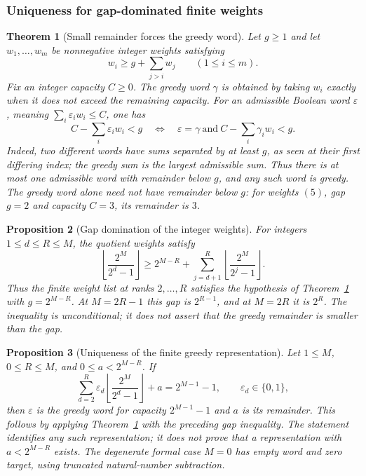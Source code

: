 \documentclass[11pt]{article}
\theoremstyle{plain}
\newtheorem{thm}{Theorem}[section]
\newtheorem{prop}[thm]{Proposition}
\theoremstyle{definition}
\theoremstyle{remark}
\begin{document}
\subsubsection*{Uniqueness for gap-dominated finite weights}

\begin{thm}[Small remainder forces the greedy word]\label{record:257bm-i11a}
Let $g\ge1$ and let $w_1,\ldots,w_m$ be nonnegative integer weights
satisfying
\[
 w_i\ge g+\sum_{j>i}w_j\qquad(1\le i\le m).
\]
Fix an integer capacity $C\ge0$. The greedy word $\gamma$ is obtained
by taking $w_i$ exactly when it does not exceed the remaining capacity.
For an admissible Boolean word $\varepsilon$, meaning
$\sum_i\varepsilon_iw_i\le C$, one has
\[
 C-\sum_i\varepsilon_iw_i<g
 \quad\Longleftrightarrow\quad
 \varepsilon=\gamma\ \text{and}\
 C-\sum_i\gamma_iw_i<g.
\]
Indeed, two different words have sums separated by at least $g$, as
seen at their first differing index; the greedy sum is the largest
admissible sum. Thus there is at most one admissible word with remainder
below $g$, and any such word is greedy. The greedy word alone need not
have remainder below $g$: for weights $(5)$, gap $g=2$ and capacity
$C=3$, its remainder is $3$.
\end{thm}

\begin{prop}[Gap domination of the integer weights]\label{record:257bm-i11b}
For integers $1\le d\le R\le M$, the quotient weights satisfy
\[
 \left\lfloor\frac{2^M}{2^d-1}\right\rfloor
 \ge 2^{M-R}+
 \sum_{j=d+1}^{R}\left\lfloor\frac{2^M}{2^j-1}\right\rfloor.
\]
Thus the finite weight list at ranks $2,\ldots,R$ satisfies the
hypothesis of Theorem~\ref{record:257bm-i11a} with $g=2^{M-R}$.
At $M=2R-1$ this gap is $2^{R-1}$, and at $M=2R$ it is $2^R$.
The inequality is unconditional; it does not assert that the greedy
remainder is smaller than the gap.
\end{prop}

\begin{prop}[Uniqueness of the finite greedy representation]\label{record:257bm-i11c}
Let $1\le M$, $0\le R\le M$, and $0\le a<2^{M-R}$. If
\[
 \sum_{d=2}^{R}\varepsilon_d
       \left\lfloor\frac{2^M}{2^d-1}\right\rfloor+a
       =2^{M-1}-1,\qquad \varepsilon_d\in\{0,1\},
\]
then $\varepsilon$ is the greedy word for capacity $2^{M-1}-1$
and $a$ is its remainder. This follows by applying
Theorem~\ref{record:257bm-i11a} with the preceding gap inequality.
The statement identifies any such representation; it does not prove
that a representation with $a<2^{M-R}$ exists. The degenerate formal
case $M=0$ has empty word and zero target, using truncated natural-number
subtraction.
\end{prop}
\end{document}
